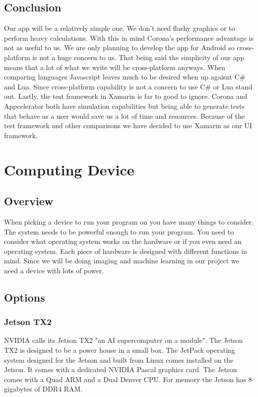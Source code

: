 \documentclass[onecolumn, draftclsnofoot,10pt, compsoc]{IEEEtran}
\begin{document}
	\subsection{Conclusion}
		Our app will be a relatively simple one.
		We don't need flashy graphics or to perform heavy calculations.
		With this in mind Corona's performance advantage is not as useful to us.
		We are only planning to develop the app for Android so cross-platform is not a huge concern to us.
		That being said the simplicity of our app means that a lot of what we write will be cross-platform anyways.
		When comparing languages Javascript leaves much to be desired when up agaisnt C\# and Lua.
		Since cross-platform capability is not a concern to use C\# or Lua stand out.
		Lastly, the test framework in Xamarin is far to good to ignore.
		Corona and Appcelerator both have simulation capabilities but being able to generate tests that behave as a user would save us a lot of time and resources.
		Because of the test framework and other comparisons we have decided to use Xamarin as our UI framework.

\section{Computing Device}
	\subsection{Overview}
		When picking a device to run your program on you have many things to consider.
		The system needs to be powerful enough to run your program.
		You need to consider what operating system works on the hardware or if you even need an operating system.
		Each piece of hardware is designed with different functions in mind.
		Since we will be doing imaging and machine learning in our project we need a device with lots of power.

	\subsection{Options}
		\subsubsection{Jetson TX2}
			NVIDIA calls its Jetson TX2 "an AI supercomputer on a module".
			The Jetson TX2 is designed to be a power house in a small box.
			The JetPack operating system designed for the Jetson and built from Linux comes installed on the Jetson\cite{jetson_dev_kit_guide}.
			It comes with a dedicated NVIDIA Pascal graphics card.
			The Jetson comes with a Quad ARM and a Dual Denver CPU.
			For memory the Jetson has 8 gigabytes of DDR4 RAM\cite{jetson_dev_kit}.
\end{document}

